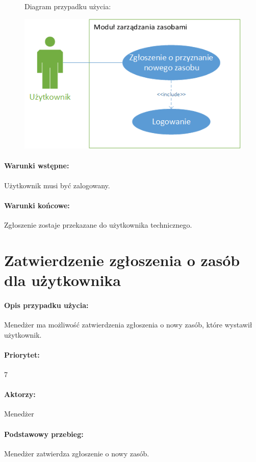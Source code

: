 \documentclass[11pt, a4paper, oneside]{report}
\begin{document}
\begin{figure}[H]
Diagram przypadku użycia:

\centering
\includegraphics[scale=1]{uzytkownik_zgloszenie_o_zasob.png}
\end{figure}

\paragraph{Warunki wstępne:} Użytkownik musi być zalogowany.
\paragraph{Warunki końcowe:} Zgłoszenie zostaje przekazane do użytkownika technicznego.

\section{Zatwierdzenie zgłoszenia o zasób dla użytkownika}
\paragraph{Opis przypadku użycia:} Menedżer ma możliwość zatwierdzenia zgłoszenia o nowy zasób, które wystawił użytkownik.
\paragraph{Priorytet:} 7
\paragraph{Aktorzy:} Menedżer
\paragraph{Podstawowy przebieg:}
Menedżer zatwierdza zgłoszenie o nowy zasób.
\end{document}
